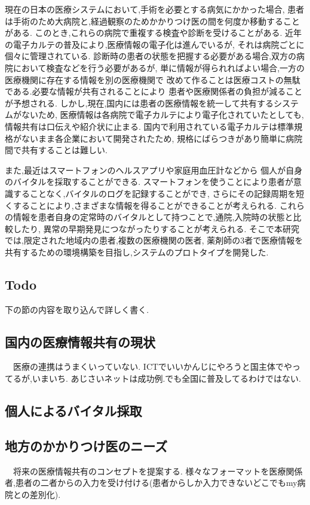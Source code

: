 現在の日本の医療システムにおいて,手術を必要とする病気にかかった場合,
患者は手術のため大病院と,経過観察のためかかりつけ医の間を何度か移動することがある.
このとき,これらの病院で重複する検査や診断を受けることがある.
近年の電子カルテの普及により,医療情報の電子化は進んでいるが,
それは病院ごとに個々に管理されている.
診断時の患者の状態を把握する必要がある場合,双方の病院において検査などを行う必要があるが,
単に情報が得られればよい場合,一方の医療機関に存在する情報を別の医療機関で
改めて作ることは医療コストの無駄である.必要な情報が共有されることにより
患者や医療関係者の負担が減ることが予想される.
しかし,現在,国内には患者の医療情報を統一して共有するシステムがないため,
医療情報は各病院で電子カルテにより電子化されていたとしても,
情報共有は口伝えや紹介状に止まる.
国内で利用されている電子カルテは標準規格がないまま各企業において開発されたため,
規格にばらつきがあり簡単に病院間で共有することは難しい.

また,最近はスマートフォンのヘルスアプリや家庭用血圧計などから
個人が自身のバイタルを採取することができる.
スマートフォンを使うことにより患者が意識することなく,バイタルのログを記録することができ,
さらにその記録周期を短くすることにより,さまざまな情報を得ることができることが考えられる.
これらの情報を患者自身の定常時のバイタルとして持つことで,通院,入院時の状態と比較したり,
異常の早期発見につながったりすることが考えられる.
そこで本研究では,限定された地域内の患者,複数の医療機関の医者,
薬剤師の3者で医療情報を共有するための環境構築を目指し,システムのプロトタイプを開発した.


\subsection{Todo}
  下の節の内容を取り込んで詳しく書く.

\subsection{国内の医療情報共有の現状}
　医療の連携はうまくいっていない.
  ICTでいいかんじにやろうと国主体でやってるが,いまいち.
  あじさいネットは成功例.でも全国に普及してるわけではない.\cite{bibi3}

\subsection{個人によるバイタル採取}

\subsection{地方のかかりつけ医のニーズ}
　将来の医療情報共有のコンセプトを提案する.
  様々なフォーマットを医療関係者,患者の二者からの入力を受け付ける(患者からしか入力できないどこでもmy病院との差別化).
